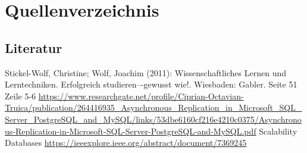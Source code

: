 

%
% 
\newpage
\thispagestyle{empty}
\section{Quellenverzeichnis}
\subsection{Literatur}
\renewcommand{\refname}{} %
\begin{thebibliography}{SW11} %
   Stickel-Wolf, Christine; Wolf, Joachim (2011): Wissenschaftliches Lernen und Lerntechniken. Erfolgreich studieren–-gewusst wie!. Wiesbaden: Gabler.
   Seite 51 Zeile 5-6 \url{https://www.researchgate.net/profile/Ciprian-Octavian-Truica/publication/264416935_Asynchronous_Replication_in_Microsoft_SQL_Server_PostgreSQL_and_MySQL/links/53dbe6160cf216e4210c0375/Asynchronous-Replication-in-Microsoft-SQL-Server-PostgreSQL-and-MySQL.pdf}
   Scalability Databases \url{https://ieeexplore.ieee.org/abstract/document/7369245}
\end{thebibliography}

